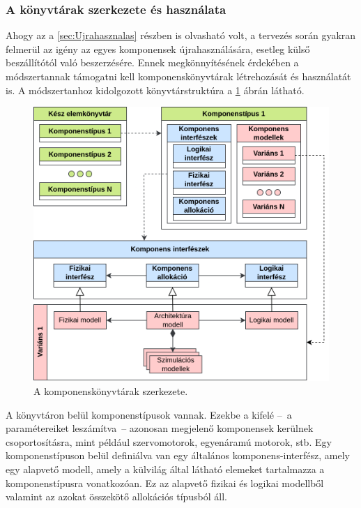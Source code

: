         \subsubsection{A könyvtárak szerkezete és használata}
        Ahogy az a \ref{sec:Ujrahasznalas} részben is olvasható volt, a tervezés során gyakran felmerül az igény az egyes komponensek újrahasználására, esetleg külső beszállítótól való beszerzésére.
        Ennek megkönnyítésének érdekében a módszertannak támogatni kell komponenskönyvtárak létrehozását és használatát is.
        A módszertanhoz kidolgozott könyvtárstruktúra a \ref{fig:Konyvtar} ábrán látható.
        \begin{figure}[!ht]
            \centering
            \includegraphics[width=150mm, keepaspectratio]{figures/InterfaceParts.drawio.png}
            \caption{A komponenskönyvtárak szerkezete.} 
            \label{fig:Konyvtar}
        \end{figure}

        A könyvtáron belül komponenstípusok vannak. Ezekbe a kifelé --~a paramétereiket leszámítva~-- azonosan megjelenő komponensek kerülnek csoportosításra, mint például szervomotorok, egyenáramú motorok, stb.
        Egy komponenstípuson belül definiálva van egy általános komponens-interfész, amely egy alapvető modell, amely a külvilág által látható elemeket tartalmazza a komponenstípusra vonatkozóan. Ez az alapvető fizikai és logikai modellből valamint az azokat összekötő allokációs típusból áll.
        
